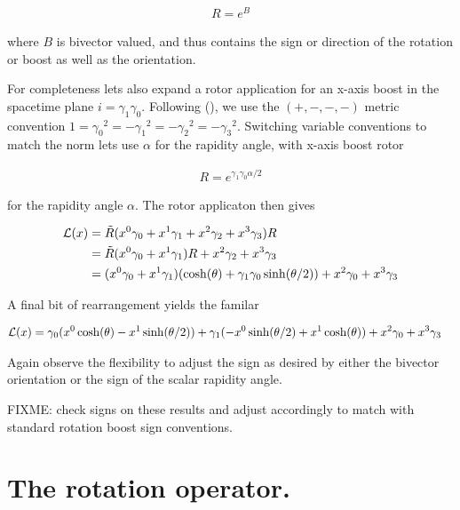 \begin{align}\label{eqn:rotationGen:foo33}
R = e^{B}
\end{align}

where $B$ is bivector valued, and thus contains the sign or direction of the rotation or boost as well as the orientation.


For completeness lets also expand a rotor application for an x-axis boost in the spacetime plane $i = \gamma_1 \gamma_0$.  Following (\cite{doran2003gap}), we use the $(+,-,-,-)$ metric convention $1 = {\gamma_0}^2 = -{\gamma_1}^2 = -{\gamma_2}^2 = -{\gamma_3}^2$.  Switching variable conventions to match the norm lets use $\alpha$ for the rapidity angle, with x-axis boost rotor

\begin{align}\label{eqn:rotationGen:foo34}
R = e^{\gamma_1 \gamma_0 \alpha/2}
\end{align}

for the rapidity angle $\alpha$.  The rotor applicaton then gives

\begin{align*}
\mathcal{L}(x) 
&= \tilde{R} (x^0 \gamma_0 + x^1 \gamma_1 + x^2 \gamma_2 + x^3 \gamma_3 ) R \\
&=
\tilde{R} (x^0 \gamma_0 + x^1 \gamma_1) R + x^2 \gamma_2 + x^3 \gamma_3 \\
&=
(x^0 \gamma_0 + x^1 \gamma_1) (\cosh(\theta) + \gamma_1 \gamma_0 \sinh(\theta/2)) + x^2 \gamma_0 + x^3 \gamma_3 \\
\end{align*}

A final bit of rearrangement yields the familar 

\begin{align}\label{eqn:rotationGen:foo35}
\mathcal{L}(x)
&=
\gamma_0 (x^0 \cosh(\theta) - x^1 \sinh(\theta/2))
+ \gamma_1 ( -x^0 \sinh(\theta/2) + x^1 \cosh(\theta))
+ x^2 \gamma_0 + x^3 \gamma_3 
\end{align}

Again observe the flexibility to adjust the sign as desired by either the bivector orientation or the sign of the scalar rapidity angle.

FIXME: check signs on these results and adjust accordingly to match with standard rotation boost sign conventions.

\section{The rotation operator.}

